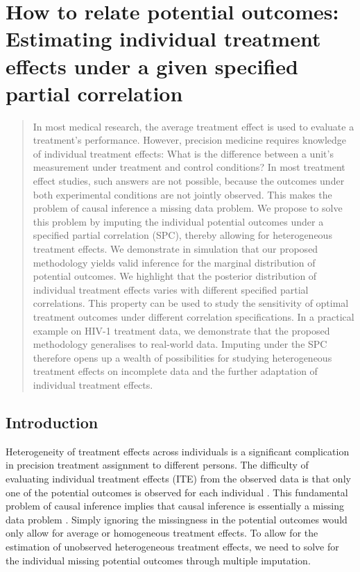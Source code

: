 \chapter{How to relate potential outcomes: Estimating individual treatment effects under a given specified partial correlation} 
\label{chap4}
	\begin{abstract}
		In most medical research, the average treatment effect is used to evaluate a treatment's performance. However, precision medicine requires knowledge of individual treatment effects: What is the difference between a unit's measurement under treatment and control conditions? In most treatment effect studies, such answers are not possible, because the outcomes under both experimental conditions are not jointly observed. This makes the problem of causal inference a missing data problem. We propose to solve this problem by imputing the individual potential outcomes under a specified partial correlation (SPC), thereby allowing for heterogeneous treatment effects. We demonstrate in simulation that our proposed methodology yields valid inference for the marginal distribution of potential outcomes. We highlight that the posterior distribution of individual treatment effects varies with different specified partial correlations. This property can be used to study the sensitivity of optimal treatment outcomes under different correlation specifications. In a practical example on HIV-1 treatment data, we demonstrate that the proposed methodology generalises to real-world data. Imputing under the SPC therefore opens up a wealth of possibilities for studying heterogeneous treatment effects on incomplete data and the further adaptation of individual treatment effects.
	\end{abstract}
	
	\section{Introduction}
	\label{sec:4.1}
	Heterogeneity of treatment effects across individuals is a significant complication in precision treatment assignment to different persons. The difficulty of evaluating individual treatment effects (ITE) from the observed data is that only one of the potential outcomes is observed for each individual \citep{rubin1974estimating, hernan2010causal}. This fundamental problem of causal inference implies that causal inference is essentially a missing data problem \citep{rubin2005causal, ding2018causal}. Simply ignoring the missingness in the potential outcomes would only allow for average or homogeneous treatment effects. To allow for the estimation of unobserved heterogeneous treatment effects, we need to solve for the individual missing potential outcomes through multiple imputation. 
	
